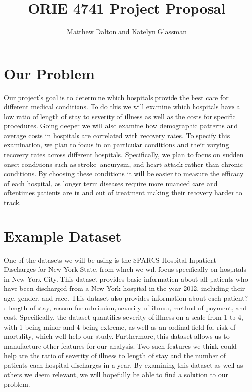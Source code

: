 \documentclass{article}
\title{ORIE 4741 Project Proposal}
\author{Matthew Dalton and Katelyn Glassman}
\begin{document}
\maketitle
 
 \section{Our Problem}
 
 \paragraph{}

	Our project's goal is to determine which hospitals provide the best care for different medical conditions. To do this we will examine which hospitals have a low ratio of length of stay to severity of illness as well as the costs for specific procedures. Going deeper we will also examine how demographic patterns and average costs in hospitals are correlated with recovery rates. To specify this examination, we plan to focus in on particular conditions and their varying recovery rates across different hospitals. Specifically, we plan to focus on sudden onset conditions such as stroke, aneurysm, and heart attack rather than chronic conditions.  By choosing these conditions it will be easier to measure the efficacy of each hospital, as longer term diseases require more nuanced care and oftentimes patients are in and out of treatment making their recovery harder to track. 

 \section{Example Dataset}
 
 \paragraph{} 
 
 One of the datasets we will be using is the SPARCS Hospital Inpatient Discharges for New York State, from which we will focus specifically on hospitals in New York City. This dataset provides basic information about all patients who have been discharged from a New York hospital in the year 2012, including their age, gender, and race. This dataset also provides information about each patient?s length of stay, reason for admission, severity of illness, method of payment, and cost.  Specifically, the dataset quantifies severity of illness on a scale from 1 to 4, with 1 being minor and 4 being extreme, as well as an ordinal field for risk of mortality, which well help our study.  Furthermore, this dataset allows us to manufacture other features for our analysis. Two such features we think could help are the ratio of severity of illness to length of stay and the number of patients each hospital discharges in a year. By examining this dataset as well as others we deem relevant, we will hopefully be able to find a solution to our problem.
\end{document}
